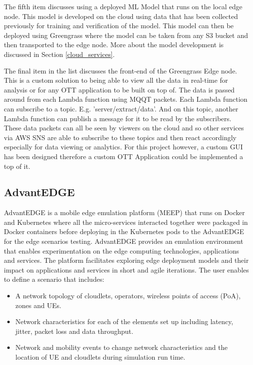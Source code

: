 The fifth item discusses using a deployed ML Model that runs on the local edge node. This model is developed on the cloud using data that has been collected previously for training and verification of the model. This model can then be deployed using Greengrass where the model can be taken from any S3 bucket and then transported to the edge node. More about the model development is discussed in Section \ref{cloud_services}.

The final item in the list discusses the front-end of the Greengrass Edge node. This is a custom solution to being able to view all the data in real-time for analysis or for any OTT application to be built on top of. The data is passed around from each Lambda function using MQQT packets. Each Lambda function can subscribe to a topic. E.g. 'server/extract/data'. And on this topic, another Lambda function can publish a message for it to be read by the subscribers. These data packets can all be seen by viewers on the cloud and so other services via AWS SNS are able to subscribe to these topics and then react accordingly especially for data viewing or analytics. For this project however, a custom GUI has been designed therefore a custom OTT Application could be implemented a top of it.

\subsection{AdvantEDGE}
AdvantEDGE is a mobile edge emulation platform (MEEP) that runs on Docker and Kubernetes where all the micro-services interacted together were packaged in Docker containers before deploying in the Kubernetes pods to the AdvantEDGE for the edge scenarios testing. AdvantEDGE provides an emulation environment that enables experimentation on the edge computing technologies, applications and services. The platform facilitates exploring edge deployment models and their impact on applications and services in short and agile iterations. The user enables to define a scenario that includes:
\begin{itemize}
    \item A network topology of cloudlets, operators, wireless points of access (PoA), zones and UEs.
    \item Network characteristics for each of the elements set up including latency, jitter, packet loss and data throughput.
    \item Network and mobility events to change network characteristics and the location of UE and cloudlets during simulation run time. 
\end{itemize}

